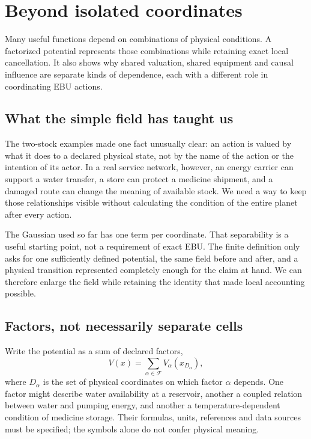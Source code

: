 \chapter{Beyond isolated coordinates}\label{ch:factors}

Many useful functions depend on combinations of physical conditions. A factorized potential represents those combinations while retaining exact local cancellation. It also shows why shared valuation, shared equipment and causal influence are separate kinds of dependence, each with a different role in coordinating EBU actions.


\section{What the simple field has taught us}
The two-stock examples made one fact unusually clear: an action is valued by what it does to a declared physical state, not by the name of the action or the intention of its actor. In a real service network, however, an energy carrier can support a water transfer, a store can protect a medicine shipment, and a damaged route can change the meaning of available stock. We need a way to keep those relationships visible without calculating the condition of the entire planet after every action.

The Gaussian used so far has one term per coordinate. That separability is a useful starting point, not a requirement of exact EBU. The finite definition only asks for one sufficiently defined potential, the same field before and after, and a physical transition represented completely enough for the claim at hand. We can therefore enlarge the field while retaining the identity that made local accounting possible.

\section{Factors, not necessarily separate cells}
Write the potential as a sum of declared factors,
\begin{equation}\label{eq:factor-potential}
 V(x)=\sum_{\alpha\in\mathcal F}V_\alpha(x_{D_\alpha}),
\end{equation}
where $D_\alpha$ is the set of physical coordinates on which factor $\alpha$ depends. One factor might describe water availability at a reservoir, another a coupled relation between water and pumping energy, and another a temperature-dependent condition of medicine storage. Their formulas, units, references and data sources must be specified; the symbols alone do not confer physical meaning.

